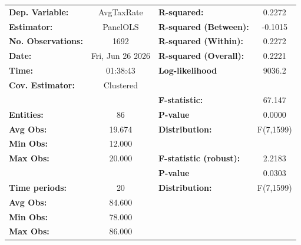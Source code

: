 \begin{center}
\begin{tabular}{lclc}
\toprule
\textbf{Dep. Variable:}                       &     AvgTaxRate     & \textbf{  R-squared:         }   &      0.2272      \\
\textbf{Estimator:}                           &      PanelOLS      & \textbf{  R-squared (Between):}  &     -0.1015      \\
\textbf{No. Observations:}                    &        1692        & \textbf{  R-squared (Within):}   &      0.2272      \\
\textbf{Date:}                                &  Fri, Jun 26 2026  & \textbf{  R-squared (Overall):}  &      0.2221      \\
\textbf{Time:}                                &      01:38:43      & \textbf{  Log-likelihood     }   &      9036.2      \\
\textbf{Cov. Estimator:}                      &     Clustered      & \textbf{                     }   &                  \\
\textbf{}                                     &                    & \textbf{  F-statistic:       }   &      67.147      \\
\textbf{Entities:}                            &         86         & \textbf{  P-value            }   &      0.0000      \\
\textbf{Avg Obs:}                             &       19.674       & \textbf{  Distribution:      }   &    F(7,1599)     \\
\textbf{Min Obs:}                             &       12.000       & \textbf{                     }   &                  \\
\textbf{Max Obs:}                             &       20.000       & \textbf{  F-statistic (robust):} &      2.2183      \\
\textbf{}                                     &                    & \textbf{  P-value            }   &      0.0303      \\
\textbf{Time periods:}                        &         20         & \textbf{  Distribution:      }   &    F(7,1599)     \\
\textbf{Avg Obs:}                             &       84.600       & \textbf{                     }   &                  \\
\textbf{Min Obs:}                             &       78.000       & \textbf{                     }   &                  \\
\textbf{Max Obs:}                             &       86.000       & \textbf{                     }   &                  \\

\end{tabular}
\end{center}
